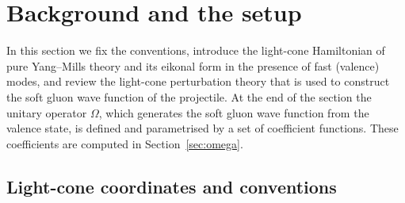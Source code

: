 \section{Background and the setup}\label{sec:setup}

In this section we fix the conventions, introduce the light-cone Hamiltonian of pure Yang--Mills theory and its eikonal form in the presence of fast (valence) modes, and review the light-cone perturbation theory that is used to construct the soft gluon wave function of the projectile. At the end of the section the unitary operator $\Omega$, which generates the soft gluon wave function from the valence state, is defined and parametrised by a set of coefficient functions. These coefficients are computed in Section~\ref{sec:omega}.

\subsection{Light-cone coordinates and conventions}\label{sec:conventions}

